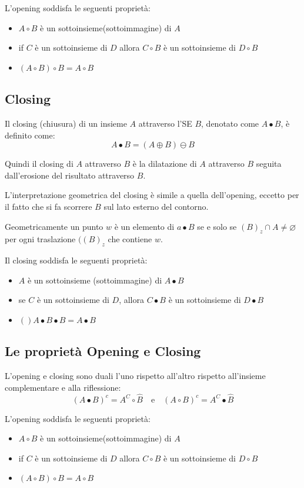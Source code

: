 L'opening soddisfa le seguenti proprietà:
\begin{itemize}
	\item $A \circ B$ è un sottoinsieme(sottoimmagine) di $A$
	\item if $C$ è un sottoinsieme di $D$ allora $C \circ B$ è un sottoinsieme di $D \circ B$
	\item $(A \circ B) \circ B = A \circ B$
\end{itemize}

\subsection{Closing}
Il closing  (chiusura) di un insieme $A$ attraverso l'SE $B$, denotato come $A \bullet B$, è definito come:
$$
A \bullet B = (A \oplus B) \ominus B
$$

Quindi il closing di $A$ attraverso $B$ è la dilatazione di $A$ attraverso $B$ seguita dall'erosione del risultato attraverso $B$.

L'interpretazione geometrica del closing è simile a quella dell'opening, eccetto per il fatto che si fa scorrere $B$ sul lato esterno del contorno.

Geometricamente un punto $w$ è un elemento di $a \bullet B$ se e solo se $(B)_z \cap A \neq \varnothing$ per ogni traslazione $((B)_z$ che contiene $w$.

Il closing soddisfa le seguenti proprietà:
\begin{itemize}
	\item $A$ è un sottoinsieme (sottoimmagine) di $A \bullet B$
	\item se $C$ è un sottoinsieme di $D$, allora $C \bullet B$ è un sottoinsieme di $D \bullet B$
	\item $()A \bullet B \bullet B = A \bullet B$
\end{itemize}

\subsection{Le proprietà Opening e Closing}
L'opening e closing sono duali l'uno rispetto all'altro rispetto all'insieme complementare e alla riflessione:
$$
(A \bullet B)^c = A^C \circ \hat B \quad \text{e} \quad (A \circ B)^c = A^C \bullet \hat B
$$

L'opening soddisfa le seguenti proprietà:
\begin{itemize}
	\item $A \circ B$ è un sottoinsieme(sottoimmagine) di $A$
	\item if $C$ è un sottoinsieme di $D$ allora $C \circ B$ è un sottoinsieme di $D \circ B$
	\item $(A \circ B) \circ B = A \circ B$
\end{itemize}


